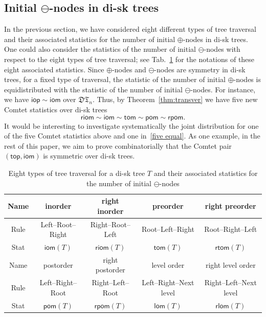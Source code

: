 \documentclass[12pt]{amsart}
\numberwithin{equation}{section}
\theoremstyle{plain}
\theoremstyle{definition}
\newcommand{\DT}{\mathfrak{DT}}
\def\iop{\mathsf{iop}}
\def\top{\mathsf{top}}
\def\iom{\mathsf{iom}}
\def\tom{\mathsf{tom}}
\def\riom{\mathsf{riom}}
\def\rtom{\mathsf{rtom}}
\def\pom{\mathsf{pom}}
\def\lom{\mathsf{lom}}
\def\rpom{\mathsf{rpom}}
\def\rlom{\mathsf{rlom}}
\begin{document}
\subsection{Initial $\ominus$-nodes in di-sk trees}


In the previous section, we have considered eight different types of  tree  traversal and their associated statistics for the number of initial $\oplus$-nodes in di-sk trees. One could also consider the statistics of the number of initial $\ominus$-nodes with respect to the  eight types of tree traversal; see Tab.~\ref{eight-tree-omi} for the notations of these eight associated statistics. Since $\oplus$-nodes and $\ominus$-nodes are symmetry in di-sk trees, for  a fixed type of traversal,  the statistic of the number of initial $\oplus$-nodes is equidistributed with the statistic of  the number of initial $\ominus$-nodes. For instance, we have $\iop\sim\iom$ over $\DT_n$. Thus, by Theorem~\ref{thm:transver} we have five new Comtet statistics over di-sk trees
$$
\riom\sim\iom\sim\tom\sim\pom\sim\rpom.
$$
It would be interesting to investigate systematically the joint distribution for one of the five Comtet statistics above and one in~\eqref{five equal}. As one example, in the rest of this paper,  we aim to prove combinatorially that the Comtet pair $(\top,\iom)$ is symmetric over di-sk trees. 


\begin{table}[bp]\caption{Eight types of tree traversal for a di-sk tree $T$ and their associated statistics for the number of initial $\ominus$-nodes}\label{eight-tree-omi}
\centering
\begin{tabular}{|c||c|c|c|c|}
\hline
Name & inorder & right inorder & preorder & right preorder \\
\hline
Rule & Left--Root--Right & Right--Root--Left & Root--Left--Right & Root--Right--Left \\
\hline
Stat & $\iom(T)$ & $\riom(T)$ & $\tom(T)$ & $\rtom(T)$ \\
\hline
Name & postorder & right postorder & level order & right level order \\
\hline
Rule & Left--Right--Root & Right--Left--Root & Left--Right--Next level & Right--Left--Next level \\
\hline
Stat & $\pom(T)$ & $\rpom(T)$ & $\lom(T)$ & $\rlom(T)$ \\
\hline
\end{tabular}
\end{table}
\end{document}
